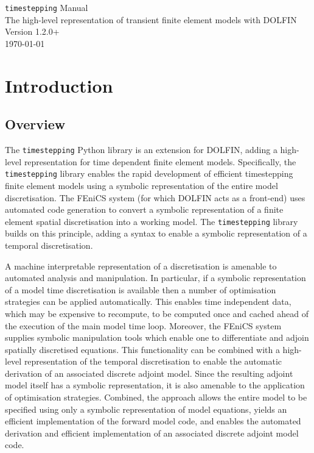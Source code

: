 \documentclass[a4paper]{book}
\newcommand{\version}{1.2.0+}
\begin{document}
\begin{titlepage}
\begin{center}

\Huge{\verb+timestepping+ Manual} \\[0.02\textheight]
\large{The high-level representation of transient finite element models with DOLFIN} \\[0.02\textheight]
\Huge{Version \version} \\[0.15\textheight]
\vfill
\large{\today}

\end{center}
\end{titlepage}

\tableofcontents

\chapter{Introduction}

\section{Overview}

The \verb+timestepping+ Python library is an extension for DOLFIN, adding a
high-level representation for time dependent finite element models.
Specifically, the \verb+timestepping+ library enables the rapid development of
efficient timestepping finite element models using a symbolic representation of
the entire model discretisation. The FEniCS system (for which DOLFIN acts as a
front-end) uses automated code generation to convert a symbolic representation
of a finite element spatial discretisation into a working model. The
\verb+timestepping+ library builds on this principle, adding a syntax to enable
a symbolic representation of a temporal discretisation.

A machine interpretable representation of a discretisation is amenable to
automated analysis and manipulation. In particular, if a symbolic representation
of a model time discretisation is available then a number of optimisation
strategies can be applied automatically. This enables time independent data,
which may be expensive to recompute, to be computed once and cached ahead of the
execution of the main model time loop. Moreover, the FEniCS system supplies
symbolic manipulation tools which enable one to differentiate and adjoin
spatially discretised equations. This functionality can be combined with a
high-level representation of the temporal discretisation to enable the automatic
derivation of an associated discrete adjoint model. Since the resulting adjoint
model itself has a symbolic representation, it is also amenable to the
application of optimisation strategies. Combined, the approach allows the entire
model to be specified using only a symbolic representation of model equations,
yields an efficient implementation of the forward model code, and enables the
automated derivation and efficient implementation of an associated discrete
adjoint model code.
\end{document}
